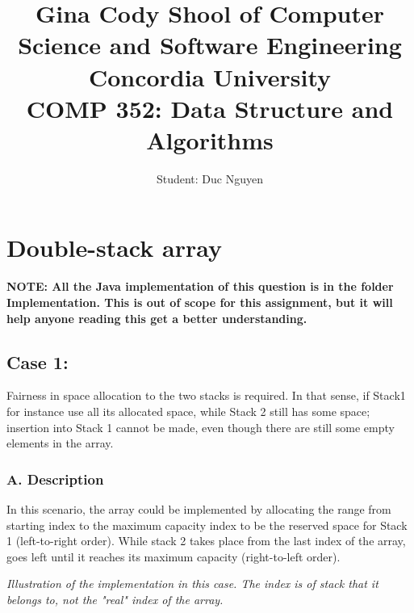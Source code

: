 \documentclass[16pt, letterpaper]{article}
\title{Gina Cody Shool of Computer Science and Software Engineering \\Concordia University
\\COMP 352: Data Structure and Algorithms }
\author{Student: Duc Nguyen}
\date{}
\newcounter{nodeidx}
\newcommand{\nodes}[1]{%
    \foreach \num in {#1}{
      \node[minimum size=6mm, draw, rectangle] (\arabic{nodeidx}) at (\arabic{nodeidx},0) {\num};
      \stepcounter{nodeidx}
    }
    \setcounter{nodeidx}{1}
}
\newcommand{\brckt}[4]{%
  \draw (#1.south west) ++($(-.1, -.1) + (-.1*#3, 0)$) -- ++($(0,-.1) + (0,-#3*1.25em)$) -- node [below] {#4} ($(#2.south east) + (.1,-.1) + (.1*#3, 0) + (0,-.1) + (0,-#3*1.25em)$) -- ++($(0,#3*1.25em) + (0,.1)$);%
}
\begin{document}
\begin{titlepage}
\maketitle
\end{titlepage}
\tableofcontents

\section{Double-stack array} 
\textbf{NOTE: All the Java implementation of this question is in the folder Implementation. This is out of scope for this assignment, but it will help anyone reading this get a better understanding.}
\subsection{Case 1: }
Fairness in space allocation to the two stacks is required. In that sense, if Stack1 for instance use all its allocated space, while Stack 2 still has some space; insertion into Stack 1 cannot be made, even though there are still some empty elements in the array.

\subsubsection*{A. Description}
In this scenario, the array could be implemented by allocating the range from starting index to the maximum capacity index to be the reserved space for Stack 1 (left-to-right order). 
While stack 2 takes place from the last index of the array, goes left until it reaches its maximum capacity (right-to-left order).


\textit{Illustration of the implementation in this case. The index is of stack that it belongs to, not the "real" index of the array. }
\end{document}
